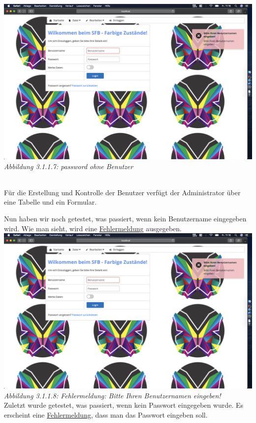 \documentclass[enabledeprecatedfontcommands,fontsize=12pt,paper=a4,twoside]{scrartcl}
\begin{document}
\hypertarget{sc3.1.1.7}{
\includegraphics[width=1\textwidth]{Screenshots/311PasswordohneBenutzer.png}
\textit{Abbildung 3.1.1.7: password ohne Benutzer}
} \\
Für die Erstellung und Kontrolle der Benutzer verfügt der Administrator über eine Tabelle und ein Formular.

Nun haben wir noch getestet, was passiert, wenn kein Benutzername eingegeben wird. Wie man sieht, wird eine  \hyperlink{sc3.1.1.8}{Fehlermeldung} ausgegeben. \\

\hypertarget{sc3.1.1.8}{
\includegraphics[width=1\textwidth]{Screenshots/311PasswordohneBenutzer.png}
\textit{Abbildung 3.1.1.8: Fehlermeldung: Bitte Ihren Benutzernamen eingeben!}
} \\

Zuletzt wurde getestet, was passiert, wenn kein Passwort eingegeben wurde. Es erscheint eine \hyperlink{sc3.1.1.9}{Fehlermeldung}, dass man das Passwort eingeben soll. 
\end{document}

